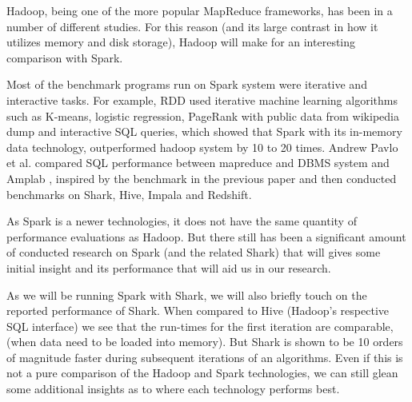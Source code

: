 \documentclass{article}
\begin{document}
Hadoop, being one of the more popular MapReduce frameworks, has been in a
number of different studies. For this reason (and its large contrast in how
it utilizes memory and disk storage), Hadoop will make for an interesting
comparison with Spark.

Most of the benchmark programs run on Spark system were iterative and interactive tasks. For example, RDD\citep{zaharia_rdd} used iterative machine learning algorithms such as K-means, logistic regression, PageRank with public data from wikipedia dump and interactive SQL queries, which showed that Spark with its in-memory data technology, outperformed hadoop system by 10 to 20 times. Andrew Pavlo et al. \cite{andrew} compared SQL performance between mapreduce and DBMS system and Amplab \citep{amplab_bench}, inspired by the benchmark in the previous paper and then conducted benchmarks on Shark, Hive\citep{ashish}, Impala and Redshift.


As Spark is a newer technologies, it does not have the same quantity of
performance evaluations as Hadoop. But there still has been a significant
amount of conducted research on Spark (and the related Shark) that will gives
some initial insight and its performance that will aid us in our research.






As we will be running Spark with Shark, we will also briefly touch on the
reported performance of Shark. When compared to Hive (Hadoop's respective
SQL interface) we see that the run-times for the first iteration are comparable,
(when data need to be loaded into memory). But Shark is shown to be 10 orders
of magnitude faster during subsequent iterations of an algorithms\citep{engle}.
Even if this is not a pure comparison of the Hadoop and Spark technologies, we
can still glean some additional insights as to where each technology performs
best.
\end{document}
